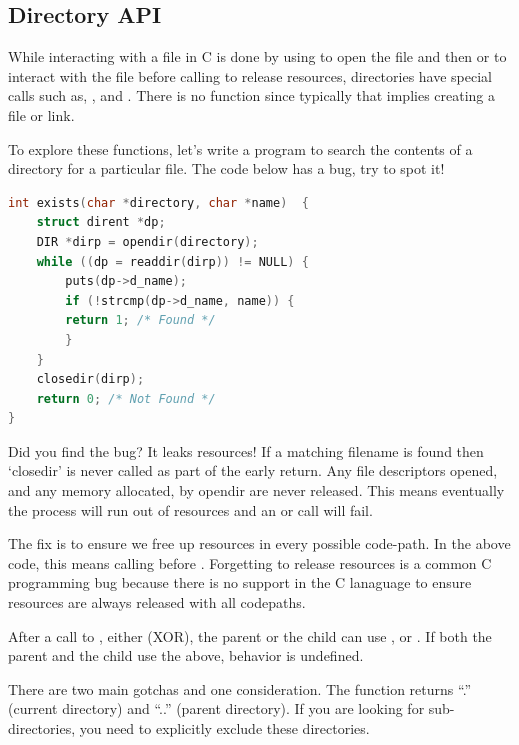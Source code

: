 \subsection{Directory API}

While interacting with a file in C is done by using  to open the file and then  or  to interact with the file before calling  to release resources, directories have special calls such as, ,  and .
There is no function  since typically that implies creating a file or link.

To explore these functions, let's write a program to search the contents of a directory for a particular file.
The code below has a bug, try to spot it!

\begin{lstlisting}[language=C]
int exists(char *directory, char *name)  {
    struct dirent *dp;
    DIR *dirp = opendir(directory);
    while ((dp = readdir(dirp)) != NULL) {
        puts(dp->d_name);
        if (!strcmp(dp->d_name, name)) {
        return 1; /* Found */
        }
    }
    closedir(dirp);
    return 0; /* Not Found */
}
\end{lstlisting}

Did you find the bug?
It leaks resources!
If a matching filename is found then `closedir' is never called as part of the early return.
Any file descriptors opened, and any memory allocated, by opendir are never released.
This means eventually the process will run out of resources and an  or  call will fail.

The fix is to ensure we free up resources in every possible code-path.
In the above code, this means calling  before .
Forgetting to release resources is a common C programming bug because there is no support in the C lanaguage to ensure resources are always released with all codepaths.


After a call to , either (XOR), the parent or the child can use ,  or .
If both the parent and the child use the above, behavior is undefined.

There are two main gotchas and one consideration.
The  function returns ``.'' (current directory) and ``..'' (parent directory).
If you are looking for sub-directories, you need to explicitly exclude these directories.

